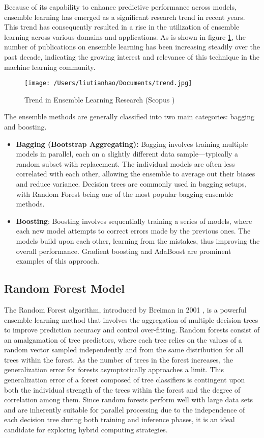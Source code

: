 \documentclass[13pt]{article}
\begin{document}
Because of its capability to enhance predictive performance across models, ensemble learning has emerged as a significant research trend in recent years. 
This trend has consequently resulted in a rise in the utilization of ensemble learning across various domains and applications.
As is shown in figure \ref{fig:trend}, the number of publications on ensemble learning has been increasing steadily over the past decade, indicating the growing interest and relevance of this technique in the machine learning community.
\begin{figure}[h!]
    \centering
    \texttt{[image: /Users/liutianhao/Documents/trend.jpg]}
    \caption{Trend in Ensemble Learning Research (Scopus \cite{scopus})}
    \label{fig:trend}
\end{figure}

The ensemble methods are generally classified into two main categories: bagging and boosting.
\begin{itemize}
    \item \textbf{Bagging (Bootstrap Aggregating):} 
    Bagging involves training multiple models in parallel, each on a slightly different data sample—typically a random subset with replacement. The individual models are often less correlated with each other, allowing the ensemble to average out their biases and reduce variance. Decision trees are commonly used in bagging setups, with Random Forest being one of the most popular bagging ensemble methods.
    \item \textbf{Boosting}:
    Boosting involves sequentially training a series of models, where each new model attempts to correct errors made by the previous ones. The models build upon each other, learning from the mistakes, thus improving the overall performance. Gradient boosting and AdaBoost are prominent examples of this approach.
\end{itemize}


\subsection{Random Forest Model}
The Random Forest algorithm, introduced by Breiman in 2001 \cite{random_forest}, is a powerful ensemble learning method that involves the aggregation of multiple decision trees to improve prediction accuracy and control over-fitting. 
Random forests consist of an amalgamation of tree predictors, where each tree relies on the values of a random vector sampled independently and from the same distribution for all trees within the forest. 
As the number of trees in the forest increases, the generalization error for forests asymptotically approaches a limit. 
This generalization error of a forest composed of tree classifiers is contingent upon both the individual strength of the trees within the forest and the degree of correlation among them.
Since random forests perform well with large data sets and are inherently suitable for parallel processing due to the independence of each decision tree during both training and inference phases, it is an ideal candidate for exploring hybrid computing strategies.
\end{document}
